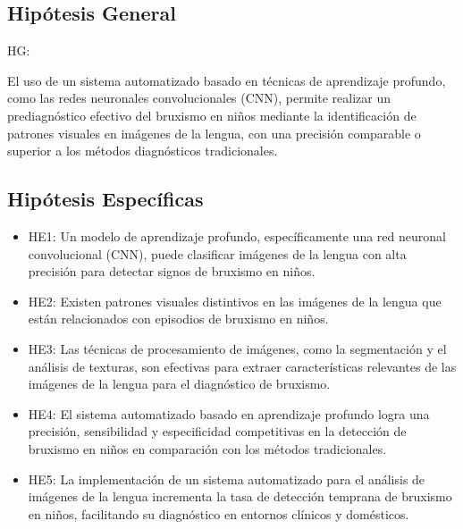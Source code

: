 \subsection{Hipótesis General}
HG: \newcommand{\HipotesisGeneral}{
	El uso de un sistema automatizado basado en técnicas de aprendizaje profundo, como las redes neuronales convolucionales (CNN), permite realizar un prediagnóstico efectivo del bruxismo en niños mediante la identificación de patrones visuales en imágenes de la lengua, con una precisión comparable o superior a los métodos diagnósticos tradicionales.
	}
\HipotesisGeneral


\subsection{Hipótesis Específicas}
\newcommand{\Hone}{
	Un modelo de aprendizaje profundo, específicamente una red neuronal convolucional (CNN), puede clasificar imágenes de la lengua con alta precisión para detectar signos de bruxismo en niños.
	}
\newcommand{\Htwo}{
	Existen patrones visuales distintivos en las imágenes de la lengua que están relacionados con episodios de bruxismo en niños.
	}
\newcommand{\Hthree}{
	Las técnicas de procesamiento de imágenes, como la segmentación y el análisis de texturas, son efectivas para extraer características relevantes de las imágenes de la lengua para el diagnóstico de bruxismo.
	}
\newcommand{\Hfour}{
	El sistema automatizado basado en aprendizaje profundo logra una precisión, sensibilidad y especificidad competitivas en la detección de bruxismo en niños en comparación con los métodos tradicionales.
	}
\newcommand{\Hfive}{
	La implementación de un sistema automatizado para el análisis de imágenes de la lengua incrementa la tasa de detección temprana de bruxismo en niños, facilitando su diagnóstico en entornos clínicos y domésticos.
		}

\begin{itemize}
	\item HE1: {\Hone}
	\item HE2: {\Htwo}
	\item HE3: {\Hthree}
	\item HE4: {\Hfour}
	\item HE5: {\Hfive}
\end{itemize}